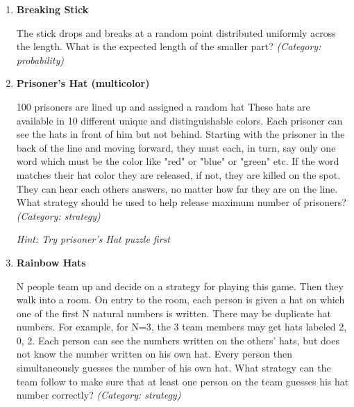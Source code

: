 \begin{enumerate}

\item \textbf{Breaking Stick}

The stick drops and breaks at a random point distributed uniformly across the length. What is the expected length of the smaller part?
\small\emph{(Category: probability)}




\item \textbf{Prisoner's Hat (multicolor)}

100 prisoners are lined up and assigned a random hat These hats are available in 10 different unique and distinguishable colors. Each prisoner can see the hats in front of him but not behind. Starting with the prisoner in the back of the line and moving forward, they must each, in turn, say only one word which must be the color like "red" or "blue" or "green" etc. If the word matches their hat color they are released, if not, they are killed on the spot. They can hear each others answers, no matter how far they are on the line. What strategy should be used to help release maximum number of prisoners?
\small\emph{(Category: strategy)}

\small\emph{Hint: Try prisoner's Hat puzzle first}





\item \textbf{Rainbow Hats}

N people team up and decide on a strategy for playing this game. Then they walk into a room.  On entry to the room, each person is given a hat on which one of the first N natural numbers is written. There may be duplicate hat numbers. For example, for N=3, the 3 team members may get hats labeled 2, 0, 2.  Each person can see the numbers written on the others' hats, but does not know the number written on his own hat. Every person then simultaneously guesses the number of his own hat.  What strategy can the team follow to make sure that at least one person on the team guesses his hat number correctly?
\small\emph{(Category: strategy)}


\end{enumerate}
